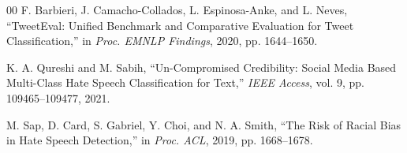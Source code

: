 \documentclass[journal]{IEEEtran}
\begin{document}
\begin{thebibliography}{00}
 F. Barbieri, J. Camacho-Collados, L.
Espinosa-Anke, and L. Neves, ``TweetEval: Unified Benchmark and
Comparative Evaluation for Tweet Classification,'' in \textit{Proc.
EMNLP Findings}, 2020, pp. 1644--1650.

 K. A. Qureshi and M. Sabih, ``Un-Compromised
Credibility: Social Media Based Multi-Class Hate Speech Classification
for Text,'' \textit{IEEE Access}, vol. 9, pp. 109465--109477, 2021.

 M. Sap, D. Card, S. Gabriel, Y. Choi, and N. A. Smith,
``The Risk of Racial Bias in Hate Speech Detection,'' in \textit{Proc.
ACL}, 2019, pp. 1668--1678.

\end{thebibliography}
\end{document}
